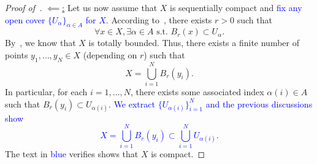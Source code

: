 \begin{proof}[Proof of~]
	\ul{$\impliedby$:} Let us now assume that $X$ is sequentially compact and \textcolor{blue}{fix any open cover $\{U_\alpha\}_{\alpha \in A}$ for $X$.} According to~, there exists $r>0$ such that
	\[
	\forall x\in X,\exists \alpha \in A\text{ s.t. }B_r(x)\subset U_\alpha.
	\]
	By~, we know that $X$ is totally bounded. Thus, there exists a finite number of points $y_1,\dots, y_N\in X$ (depending on $r$) such that
	\[
	X = \bigcup_{i=1}^NB_r(y_i).
	\]
	In particular, for each $i=1,\dots, N$, there exists some associated index $\alpha(i)\in A$ such that $B_r(y_i)\subset U_{\alpha(i)}$. \textcolor{blue}{We extract $\{U_{\alpha(i)}\}_{i=1}^N$ and the previous discussions show
	\[
	X = \bigcup_{i=1}^N B_r(y_i)\subset \bigcup_{i=1}^N U_{\alpha(i)}.
	\]
	}
	The text in \textcolor{blue}{blue} verifies shows that $X$ is compact.
\end{proof}